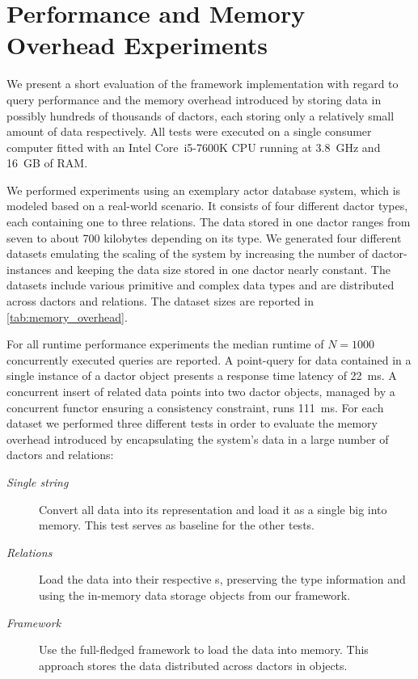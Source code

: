 
\section[Performance and Memory Overhead Experiments]{Performance and Memory Overhead Experiments}\label{sec:experiments}

  We present a short evaluation of the framework implementation with regard to query performance and the memory overhead introduced by storing data in possibly hundreds of thousands of \glspl{dactor}, each storing only a relatively small amount of data respectively. 
  All tests were executed on a single consumer computer fitted with an Intel Core~i5-7600K CPU running at 3.8~GHz and 16~GB of RAM.

  We performed experiments using an exemplary actor database system, which is modeled based on a real-world scenario.
  It consists of four different \gls{dactor} types, each containing one to three relations.
  The data stored in one \gls{dactor} ranges from seven to about 700 kilobytes depending on its type.
  We generated four different datasets emulating the scaling of the system by increasing the number of \gls{dactor}-instances and keeping the data size stored in one \gls{dactor} nearly constant.
  The datasets include various primitive and complex data types and are distributed across \glspl{dactor} and relations.
  The dataset sizes are reported in \cref{tab:memory_overhead}.

  For all runtime performance experiments the median runtime of $N=1000$ concurrently executed queries are reported.
  A point-query for data contained in a single instance of a \gls{dactor} object presents a response time latency of 22~ms.
  A concurrent insert of related data points into two \gls{dactor} objects, managed by a concurrent functor ensuring a consistency constraint, runs 111~ms.
  For each dataset we performed three different tests in order to evaluate the memory overhead introduced by encapsulating the system's data in a large number of \glspl{dactor} and relations:
  
  \begin{description}
    \item[\textit{Single string}] Convert all data into its  representation and load it as a single big  into memory.
    This test serves as baseline for the other tests.
    \item[\textit{Relations}] Load the data into their respective s, preserving the type information and using the in-memory data storage objects from our framework.
    \item[\textit{Framework}] Use the full-fledged framework to load the data into memory.
    This approach stores the data distributed across \glspl{dactor} in  objects.
  \end{description}

